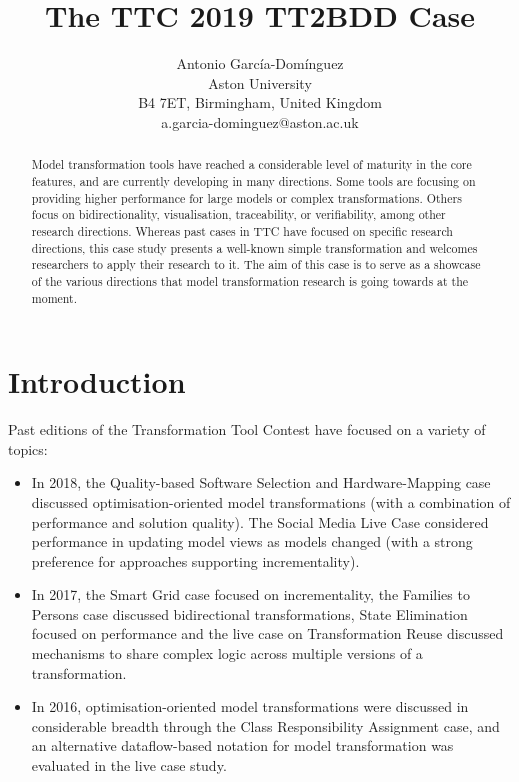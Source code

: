 \documentclass[a4paper]{scrartcl}
\title{The TTC 2019 TT2BDD Case}
\author{
  Antonio García-Domínguez\\
  Aston University\\
  B4 7ET, Birmingham, United Kingdom\\
  a.garcia-dominguez@aston.ac.uk
}
\begin{document}
\maketitle

\begin{abstract}
  Model transformation tools have reached a considerable level of maturity in
  the core features, and are currently developing in many directions. Some tools
  are focusing on providing higher performance for large models or complex
  transformations. Others focus on bidirectionality, visualisation,
  traceability, or verifiability, among other research directions. Whereas past
  cases in TTC have focused on specific research directions, this case study
  presents a well-known simple transformation and welcomes researchers to apply
  their research to it. The aim of this case is to serve as a showcase of the
  various directions that model transformation research is going towards at the
  moment.
\end{abstract}

\section{Introduction}

Past editions of the Transformation Tool Contest have focused on a variety of
topics:
\begin{itemize}
\item In 2018, the Quality-based Software Selection and Hardware-Mapping case
  discussed optimisation-oriented model transformations (with a combination of
  performance and solution quality). The Social Media Live Case considered
  performance in updating model views as models changed (with a strong
  preference for approaches supporting incrementality).

\item In 2017, the Smart Grid case focused on incrementality, the Families to
  Persons case discussed bidirectional transformations, State Elimination
  focused on performance and the live case on Transformation Reuse discussed
  mechanisms to share complex logic across multiple versions of a
  transformation.

\item In 2016, optimisation-oriented model transformations were discussed in
  considerable breadth through the Class Responsibility Assignment case, and an
  alternative dataflow-based notation for model transformation was evaluated in
  the live case study.
\end{itemize}
\end{document}
